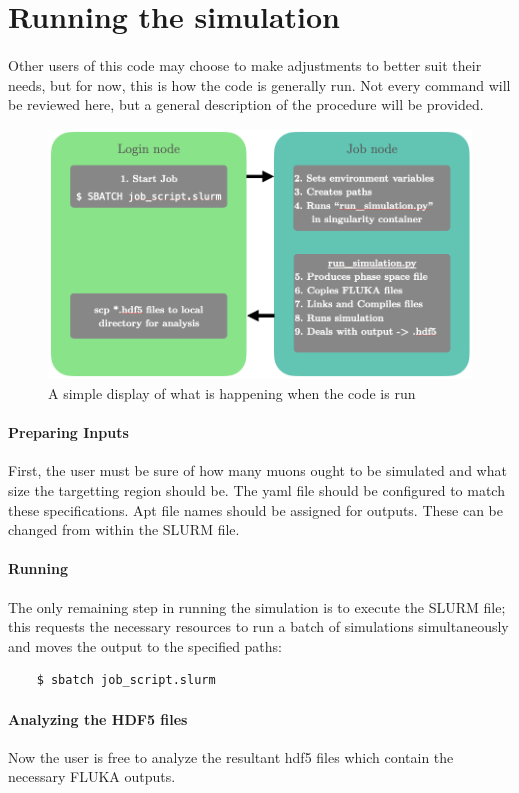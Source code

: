 \section{Running the simulation}

\paragraph{}
Other users of this code may choose to make adjustments to better suit their needs, but for now, this is how the code is generally run. Not every command will be reviewed here, but a general description of the procedure will be provided. 

\begin{figure}[h]
    \begin{center}
    \includegraphics[scale=0.5]{figures/nodes.png}
    \caption{A simple display of what is happening when the code is run}
    \label{fig:running}
    \end{center}
\end{figure}

\paragraph{Preparing Inputs}
First, the user must be sure of how many muons ought to be simulated and what size the targetting region should be. The yaml file should be configured to match these specifications. Apt file names should be assigned for outputs. These can be changed from within the SLURM file. 

\paragraph{Running}
The only remaining step in running the simulation is to execute the SLURM file; this requests the necessary resources to run a batch of simulations simultaneously and moves the output to the specified paths: \begin{verbatim}
    $ sbatch job_script.slurm
\end{verbatim}


\paragraph{Analyzing the HDF5 files}
Now the user is free to analyze the resultant hdf5 files which contain the necessary FLUKA outputs.